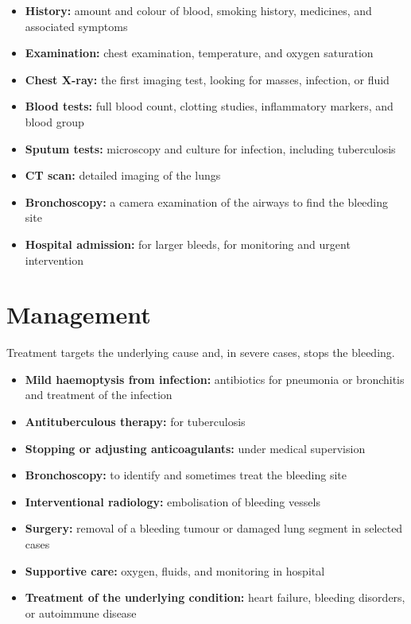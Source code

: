 \begin{itemize}
    \item \textbf{History:} amount and colour of blood, smoking history, medicines, and associated symptoms
    \item \textbf{Examination:} chest examination, temperature, and oxygen saturation
    \item \textbf{Chest X-ray:} the first imaging test, looking for masses, infection, or fluid
    \item \textbf{Blood tests:} full blood count, clotting studies, inflammatory markers, and blood group
    \item \textbf{Sputum tests:} microscopy and culture for infection, including tuberculosis
    \item \textbf{CT scan:} detailed imaging of the lungs
    \item \textbf{Bronchoscopy:} a camera examination of the airways to find the bleeding site
    \item \textbf{Hospital admission:} for larger bleeds, for monitoring and urgent intervention
\end{itemize}

\section*{Management}
Treatment targets the underlying cause and, in severe cases, stops the bleeding.

\begin{itemize}
    \item \textbf{Mild haemoptysis from infection:} antibiotics for pneumonia or bronchitis and treatment of the infection
    \item \textbf{Antituberculous therapy:} for tuberculosis
    \item \textbf{Stopping or adjusting anticoagulants:} under medical supervision
    \item \textbf{Bronchoscopy:} to identify and sometimes treat the bleeding site
    \item \textbf{Interventional radiology:} embolisation of bleeding vessels
    \item \textbf{Surgery:} removal of a bleeding tumour or damaged lung segment in selected cases
    \item \textbf{Supportive care:} oxygen, fluids, and monitoring in hospital
    \item \textbf{Treatment of the underlying condition:} heart failure, bleeding disorders, or autoimmune disease
\end{itemize}

